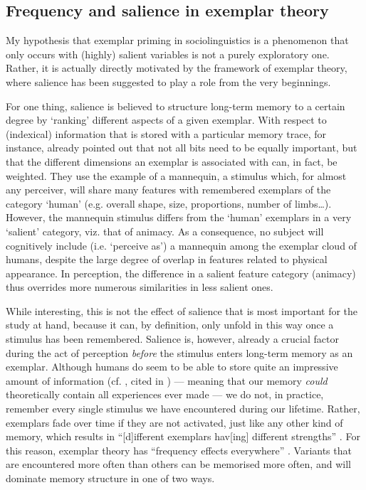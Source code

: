 		\subsection{Frequency and salience in exemplar theory}
		\label{sec.sal.exemplar.freq}
		
My hypothesis that exemplar priming in sociolinguistics is a phenomenon that only occurs with (highly) salient variables is not a purely exploratory one.
Rather, it is actually directly motivated by the framework of exemplar theory, where salience has been suggested to play a role from the very beginnings.

For one thing, salience is believed to structure long-term memory to a certain degree by `ranking' different aspects of a given exemplar.
With respect to (indexical) information that is stored with a particular memory trace, for instance, \textcite[cf.][210--212]{medinschaffer1978} already pointed out that not all bits need to be equally important, but that the different dimensions an exemplar is associated with can, in fact, be weighted.
They use the example of a mannequin, a stimulus which, for almost any perceiver, will share many features with remembered exemplars of the category `human' (e.g. overall shape, size, proportions, number of limbs\ldots).
However, the mannequin stimulus differs from the `human' exemplars in a very `salient' category, viz. that of animacy.
As a consequence, no subject will cognitively include (i.e. `perceive as') a mannequin among the exemplar cloud of humans, despite the large degree of overlap in features related to physical appearance.
In perception, the difference in a salient feature category (animacy) thus overrides more numerous similarities in less salient ones.

While interesting, this is not the effect of salience that is most important for the study at hand, because it can, by definition, only unfold in this way once a stimulus has been remembered.
Salience is, however, already a crucial factor during the act of perception \emph{before} the stimulus enters long-term memory as an exemplar.
Although humans do seem to be able to store quite an impressive amount of information (cf. \citealt{johnson2005}, cited in \citealt[44]{racz2013}) --- meaning that our memory \emph{could} theoretically contain all experiences ever made --- we do not, in practice, remember every single stimulus we have encountered during our lifetime.
Rather, exemplars fade over time if they are not activated, just like any other kind of memory, which results in ``[d]ifferent exemplars hav[ing] different strengths'' \parencite[cf.][115]{pierrehumbert2002}.
For this reason, exemplar theory has ``frequency effects everywhere'' \parencite[524]{pierrehumbert2006}.
Variants that are encountered more often than others can be memorised more often, and will dominate memory structure in one of two ways.

